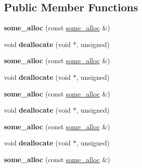 \subsection*{Public Member Functions}
\begin{DoxyCompactItemize}
\item 
\mbox{\label{structsome__alloc_af833435f134a6f8ed9c092586d0e6d2e}} 
{\bfseries some\+\_\+alloc} (const \mbox{\hyperlink{structsome__alloc}{some\+\_\+alloc}} \&)
\item 
\mbox{\label{structsome__alloc_addfc7b0c207a2a66d8b4b005d9e248b7}} 
void {\bfseries deallocate} (void $\ast$, unsigned)
\item 
\mbox{\label{structsome__alloc_af833435f134a6f8ed9c092586d0e6d2e}} 
{\bfseries some\+\_\+alloc} (const \mbox{\hyperlink{structsome__alloc}{some\+\_\+alloc}} \&)
\item 
\mbox{\label{structsome__alloc_addfc7b0c207a2a66d8b4b005d9e248b7}} 
void {\bfseries deallocate} (void $\ast$, unsigned)
\item 
\mbox{\label{structsome__alloc_af833435f134a6f8ed9c092586d0e6d2e}} 
{\bfseries some\+\_\+alloc} (const \mbox{\hyperlink{structsome__alloc}{some\+\_\+alloc}} \&)
\item 
\mbox{\label{structsome__alloc_addfc7b0c207a2a66d8b4b005d9e248b7}} 
void {\bfseries deallocate} (void $\ast$, unsigned)
\item 
\mbox{\label{structsome__alloc_af833435f134a6f8ed9c092586d0e6d2e}} 
{\bfseries some\+\_\+alloc} (const \mbox{\hyperlink{structsome__alloc}{some\+\_\+alloc}} \&)
\item 
\mbox{\label{structsome__alloc_addfc7b0c207a2a66d8b4b005d9e248b7}} 
void {\bfseries deallocate} (void $\ast$, unsigned)
\item 
\mbox{\label{structsome__alloc_af833435f134a6f8ed9c092586d0e6d2e}} 
{\bfseries some\+\_\+alloc} (const \mbox{\hyperlink{structsome__alloc}{some\+\_\+alloc}} \&)
\item 

\end{DoxyCompactItemize}
